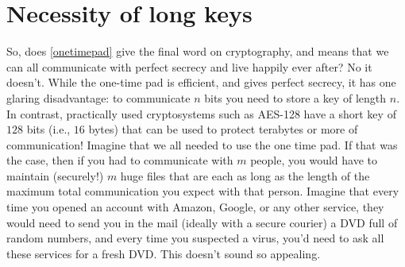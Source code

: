 
\section{Necessity of long keys}\label{Necessity-of-long-keys}

So, does \cref{onetimepad} give the final word on cryptography, and
means that we can all communicate with perfect secrecy and live happily
ever after? No it doesn't. While the one-time pad is efficient, and
gives perfect secrecy, it has one glaring disadvantage: to communicate
\(n\) bits you need to store a key of length \(n\). In contrast,
practically used cryptosystems such as AES-128 have a short key of
\(128\) bits (i.e., \(16\) bytes) that can be used to protect terabytes
or more of communication! Imagine that we all needed to use the one time
pad. If that was the case, then if you had to communicate with \(m\)
people, you would have to maintain (securely!) \(m\) huge files that are
each as long as the length of the maximum total communication you expect
with that person. Imagine that every time you opened an account with
Amazon, Google, or any other service, they would need to send you in the
mail (ideally with a secure courier) a DVD full of random numbers, and
every time you suspected a virus, you'd need to ask all these services
for a fresh DVD. This doesn't sound so appealing.

